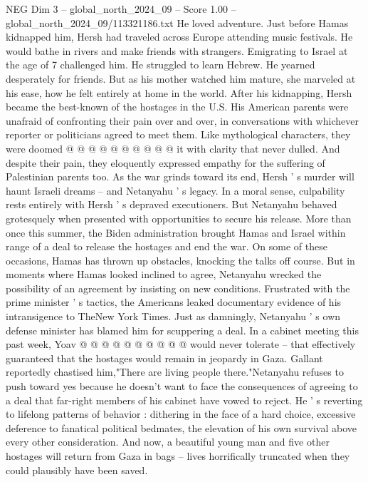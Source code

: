 \begin{textsample}{NEG Dim 3 – global\_north\_2024\_09 – Score 1.00 – global\_north\_2024\_09/113321186.txt}
He loved adventure.
Just before Hamas kidnapped him, Hersh had traveled across Europe attending music festivals.
He would bathe in rivers and make friends with strangers.
Emigrating to Israel at the age of 7 challenged him.
He struggled to learn Hebrew.
He yearned desperately for friends.
But as his mother watched him mature, she marveled at his ease, how he felt entirely at home in the world.
After his kidnapping, Hersh became the best-known of the hostages in the U.S.
His American parents were unafraid of confronting their pain over and over, in conversations with whichever reporter or politicians agreed to meet them.
Like mythological characters, they were doomed @ @ @ @ @ @ @ @ @ @ it with clarity that never dulled.
And despite their pain, they eloquently expressed empathy for the suffering of Palestinian parents too.
As the war grinds toward its end, Hersh ' s murder will haunt Israeli dreams -- and Netanyahu ' s legacy.
In a moral sense, culpability rests entirely with Hersh ' s depraved executioners.
But Netanyahu behaved grotesquely when presented with opportunities to secure his release.
More than once this summer, the Biden administration brought Hamas and Israel within range of a deal to release the hostages and end the war.
On some of these occasions, Hamas has thrown up obstacles, knocking the talks off course.
But in moments where Hamas looked inclined to agree, Netanyahu wrecked the possibility of an agreement by insisting on new conditions.
Frustrated with the prime minister ' s tactics, the Americans leaked documentary evidence of his intransigence to TheNew York Times.
Just as damningly, Netanyahu ' s own defense minister has blamed him for scuppering a deal.
In a cabinet meeting this past week, Yoav @ @ @ @ @ @ @ @ @ @ would never tolerate -- that effectively guaranteed that the hostages would remain in jeopardy in Gaza.
Gallant reportedly chastised him,"There are living people there."Netanyahu refuses to push toward yes because he doesn't want to face the consequences of agreeing to a deal that far-right members of his cabinet have vowed to reject.
He ' s reverting to lifelong patterns of behavior : dithering in the face of a hard choice, excessive deference to fanatical political bedmates, the elevation of his own survival above every other consideration.
And now, a beautiful young man and five other hostages will return from Gaza in bags -- lives horrifically truncated when they could plausibly have been saved.

\end{textsample}
